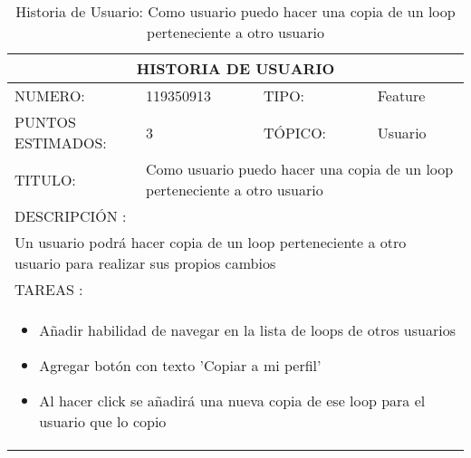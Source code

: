 \begin{table}[h]
\centering
\renewcommand{\arraystretch}{1.4}
\begin{tabular}{|*{4}{l|}}
\hline
\multicolumn{4}{|c|}{HISTORIA DE USUARIO} \\ \hline
NUMERO: & 119350913 & TIPO: & Feature \\ \hline
PUNTOS ESTIMADOS: & 3 & TÓPICO: & Usuario \\ \hline
TITULO: & \multicolumn{3}{|p{7.2cm}|}{Como usuario puedo hacer una copia de un loop perteneciente a otro usuario} \\ \hline
\multicolumn{4}{|l|}{DESCRIPCIÓN : } \\ \hline
\multicolumn{4}{|p{11cm}|}{Un usuario podrá hacer copia de un loop perteneciente a otro usuario para realizar sus propios cambios} \\ \hline
\multicolumn{4}{|l|}{TAREAS : } \\ \hline
\multicolumn{4}{|p{11cm}|}{
\begin{minipage}[t]{\hsize}
  \begin{itemize}
    \item Añadir habilidad de navegar en la lista de loops de otros usuarios
    \item Agregar botón con texto 'Copiar a mi perfil'
    \item Al hacer click se añadirá una nueva copia de ese loop para el usuario que lo copio
  \end{itemize}
\end{minipage}
} \\ \hline
\end{tabular}
\caption{Historia de Usuario: Como usuario puedo hacer una copia de un loop perteneciente a otro usuario}
\label{tab:Primero}
\end{table}


